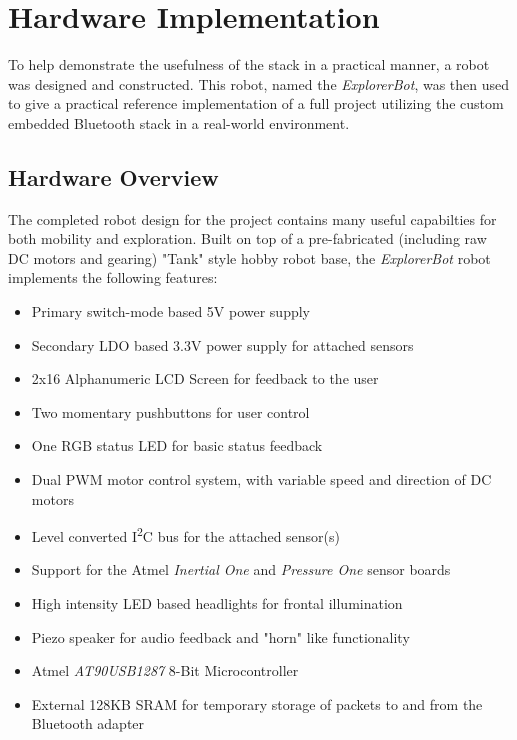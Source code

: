 \chapter{Hardware Implementation}
\label{Chapter 4}

To help demonstrate the usefulness of the stack in a practical manner, a robot was designed and constructed. This robot, named the \emph{ExplorerBot}, was then used to give a practical reference implementation of a full project utilizing the custom embedded Bluetooth stack in a real-world environment.

\section{Hardware Overview}

The completed robot design for the project contains many useful capabilties for both mobility and exploration. Built on top of a pre-fabricated (including raw DC motors and gearing) "Tank" style hobby robot base, the \emph{ExplorerBot} robot implements the following features:

\begin{itemize}
	\item Primary switch-mode based 5V power supply
	\item Secondary LDO based 3.3V power supply for attached sensors
	\item 2x16 Alphanumeric LCD Screen for feedback to the user
	\item Two momentary pushbuttons for user control
	\item One RGB status LED for basic status feedback
	\item Dual PWM motor control system, with variable speed and direction of DC motors
	\item Level converted I\textsuperscript{2}C bus for the attached sensor(s)
	\item Support for the Atmel \textit{Inertial One} and \textit{Pressure One} sensor boards
	\item High intensity LED based headlights for frontal illumination
	\item Piezo speaker for audio feedback and "horn" like functionality
	\item Atmel \textit{AT90USB1287} 8-Bit Microcontroller
	\item External 128KB SRAM for temporary storage of packets to and from the Bluetooth adapter
\end{itemize}

